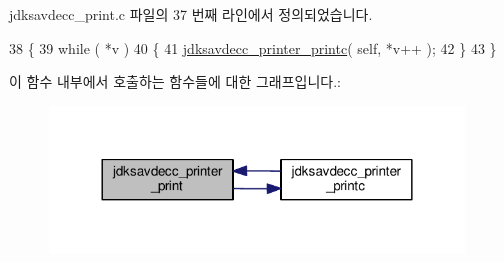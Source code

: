 jdksavdecc\+\_\+print.\+c 파일의 37 번째 라인에서 정의되었습니다.


\begin{DoxyCode}
38 \{
39     \textcolor{keywordflow}{while} ( *v )
40     \{
41         \hyperlink{group__util_ga24b25588730b43333c7b35cecc8f581d}{jdksavdecc\_printer\_printc}( \textcolor{keyword}{self}, *v++ );
42     \}
43 \}
\end{DoxyCode}


이 함수 내부에서 호출하는 함수들에 대한 그래프입니다.\+:
\nopagebreak
\begin{figure}[H]
\begin{center}
\leavevmode
\includegraphics[width=312pt]{group__util_ga335ac75e0aa3fe66501b752bf9d0f90d_cgraph}
\end{center}
\end{figure}




